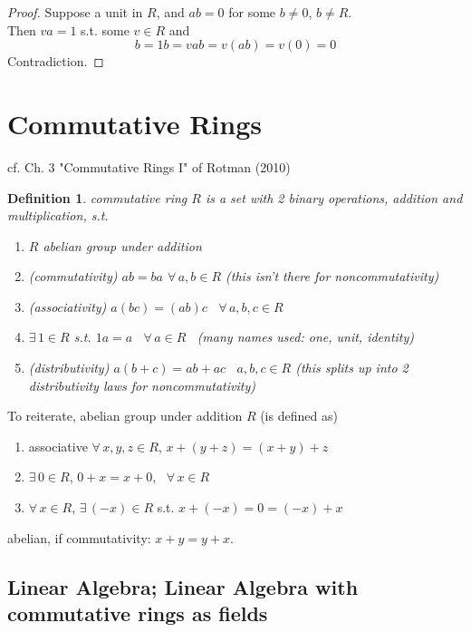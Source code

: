 \documentclass[10pt]{amsart}
\newtheorem{definition}{Definition}
\begin{document}
\begin{multicols*}{2}
\begin{proof}
	Suppose a unit in $R$, and $ab=0$ for some $b\neq 0$, $b\neq R$. \\
	Then $va=1$ s.t. some $v\in R$ and 
	\[
	b =1b = vab = v(ab) = v(0) = 0
	\]
	Contradiction.
\end{proof} 	

\section{Commutative Rings}

cf. Ch. 3 "Commutative Rings I" of Rotman (2010) \cite{JRotman2010}


\begin{definition} commutative ring $R$ is a set with 2 binary operations, addition and multiplication, s.t.
	\begin{enumerate}
		\item[(i)] $R$ abelian group under addition 
		\item[(ii)] (commutativity) $ab=ba$ \quad $\forall \, a,b \in R$  (this isn't there for noncommutativity)
		\item[(iii)] (associativity) $a(bc) = (ab)c$ \quad \, $\forall \, a,b,c\in R$
		\item[(iv)] $\exists \, 1 \in R$ s.t. $1a = a$ \, $\forall \, a  \in R$ \quad \, (many names used: one, unit, identity)
		\item[(v)] (distributivity) $a(b+c) = ab+ac$ \quad \, $a,b,c \in R$ (this splits up into 2 distributivity laws for noncommutativity)
	\end{enumerate}
\end{definition}

To reiterate, abelian group under addition $R$ (is defined as)
\begin{enumerate}
	\item associative $\forall \, x , y ,z \in R$, $x + (y+z) = (x+y)+z$ 
	\item $\exists \, 0 \in R$, $0+x = x + 0$, \, $\forall \, x \in R$ 
	\item $\forall \, x \in R$, $\exists \, (-x) \in R$ s.t. $x+(-x) = 0 = (-x) + x$
\end{enumerate}
abelian, if commutativity: $x+y=y+x$.  

\subsection{Linear Algebra; Linear Algebra with commutative rings as fields}


\end{multicols*}
\end{document}
